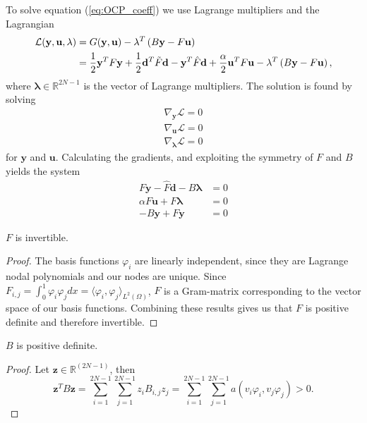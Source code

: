 To solve equation (\ref{eq:OCP_coeff}) we use Lagrange multipliers and the Lagrangian
\begin{align}
    \label{eq:OCP_lagrangian}
    \mathcal{L}(\mathbf{y, u, \lambda}) &= G(\mathbf{y, u}) - \mathbf{\lambda}^T \left( B\mathbf{y} - F\mathbf{u} \right) \\
    &= \frac{1}{2}\mathbf{y}^T F \mathbf{y} + \frac{1}{2}\mathbf{d}^T\Tilde{F} \mathbf{d} - \mathbf{y}^T\hat{F}\mathbf{d} + \frac{\alpha}{2}\mathbf{u}^T F \mathbf{u}  - \mathbf{\lambda}^T \left( B\mathbf{y} - F\mathbf{u} \right) ,
\end{align}
where $\mathbf{\lambda} \in \mathds{R}^{2N-1}$ is the vector of Lagrange multipliers.
The solution is found by solving
\begin{align}
    \label{eq:gradients}
    \nabla_{\mathbf{y}}\mathcal{L} = 0 \\
    \nabla_{\mathbf{u}}\mathcal{L} = 0 \\
    \nabla_{\mathbf{\mathbf{\lambda}}}\mathcal{L} = 0
\end{align}
for $\mathbf{y}$ and $\mathbf{u}$.
Calculating the gradients, and exploiting the symmetry of \( F \) and \( B \)
yields the system
\begin{align}
  F \mathbf{y}- \hat{F}\mathbf{d} - B\mathbf{\lambda} &= 0 \\
  \alpha F \mathbf{u}+ F\mathbf{\lambda} &= 0 \\
  -B \mathbf{y} + F \mathbf{y} &= 0
\end{align}

\begin{lemma}
    $F$ is invertible.    
\end{lemma}
\begin{proof}
    \label{lemma:F_invertible}
    The basis functions $\varphi_i$ are linearly independent, since they are Lagrange nodal polynomials and our nodes are unique.
    Since $F_{i,j} = \int_0^1 \varphi_i \varphi_j dx = \langle \varphi_i, \varphi_j \rangle_{L^2(\Omega)}$,
    $F$ is a Gram-matrix corresponding to the vector space of our basis functions.
    Combining these results gives us that $F$ is positive definite and therefore invertible.
\end{proof}

\begin{lemma}
    \label{lemma:B_pos_def}
    $B$ is positive definite.
\end{lemma}
\begin{proof}
    Let $\mathbf{z} \in \mathds{R}^{(2N-1)}$, then 
    $$\mathbf{z}^T B \mathbf{z} = \sum_{i=1}^{2N-1}\sum_{j=1}^{2N-1} z_i B_{i,j}z_j =\sum_{i=1}^{2N-1}\sum_{j=1}^{2N-1}a(v_i \varphi_i, v_j\varphi_j) >0 .$$
\end{proof}

